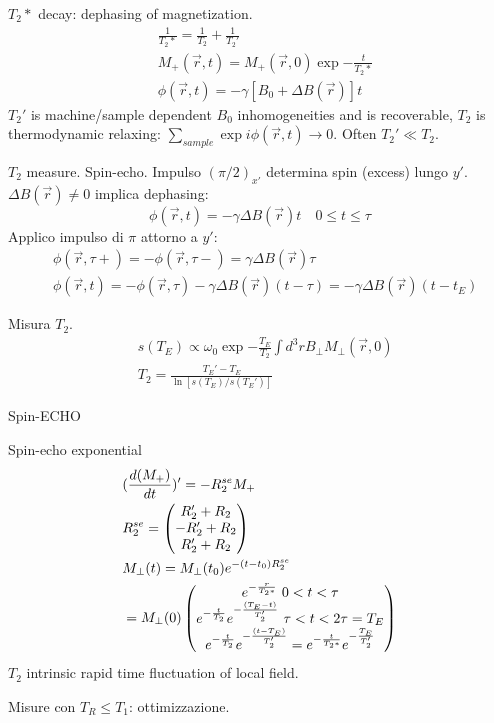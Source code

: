 \begin{frame}{$T_2*$ decay: dephasing of magnetization.}
\begin{align*}
&\frac{1}{T_2*}=\frac{1}{T_2}+\frac{1}{T_2'}\\
&M_+(\vec{r},t)=M_+(\vec{r},0)\exp{-\frac{t}{T_2*}}\\
&\phi(\vec{r},t)=-\gamma[B_0+\Delta B(\vec{r})]t
\end{align*}
$T_2'$ is machine/sample dependent $B_0$ inhomogeneities and is recoverable, $T_2$ is thermodynamic relaxing: $\sum_{sample}\exp{i\phi(\vec{r},t)}\to0$. Often $T_2'\ll T_2$.

\begin{block}{$T_2$ measure. Spin-echo.}
Impulso $(\pi/2)_{x'}$ determina spin (excess) lungo $y'$. $\Delta B(\vec{r})\neq0$ implica dephasing:
\begin{equation*}
\phi(\vec{r},t)=-\gamma\Delta B(\vec{r})t\quad 0\leq t\leq\tau
\end{equation*}
Applico impulso di $\pi$ attorno a $y'$:
\begin{align*}
&\phi(\vec{r},\tau+)=-\phi(\vec{r},\tau-)=\gamma\Delta B(\vec{r})\tau\\
&\phi(\vec{r},t)=-\phi(\vec{r},\tau)-\gamma\Delta B(\vec{r})(t-\tau)=-\gamma\Delta B(\vec{r})(t-t_E)
\end{align*}
\end{block}
\begin{block}{Misura $T_2$.}
\begin{align*}
&s(T_E)\propto\omega_0\exp{-\frac{T_E}{T_2}}\int d^3 rB_{\perp}M_{\perp}(\vec{r},0)\\
&T_2=\frac{T_E'-T_E}{\ln{[s(T_E)/s(T_E')]}}
\end{align*}
\end{block}
\end{frame}

\begin{wordonframe}{Spin-ECHO}
\begin{block}{Spin-echo exponential}
\begin{align*}
&(\TDy{t}{(M_+)})'=-R_2^{se}M_+\\
&R_2^{se}=\begin{pmatrix}R_2'+R_2\\-R_2'+R_2\\R_2'+R_2\end{pmatrix}\\
&M_{\perp}(t)=M_{\perp}(t_0)\exp{-(t-t_0)R_2^{se}}\\
&=M_{\perp}(0)\begin{pmatrix}\exp{-\frac{r}{T_2*}}\ 0<t<\tau\\\exp{-\frac{t}{T_2}}\exp{-\frac{(T_E-t)}{T_2'}}\ \tau<t<2\tau=T_E\\ \exp{-\frac{t}{T_2}}\exp{-\frac{(t-T_E)}{T_2'}}=\exp{-\frac{t}{T_2*}}\exp{-\frac{T_E}{T_2'}} \end{pmatrix}
\end{align*}
$T_2$ intrinsic rapid time fluctuation of local field.
\end{block}
Misure con $T_R\leq T_1$: ottimizzazione.
\end{wordonframe}

